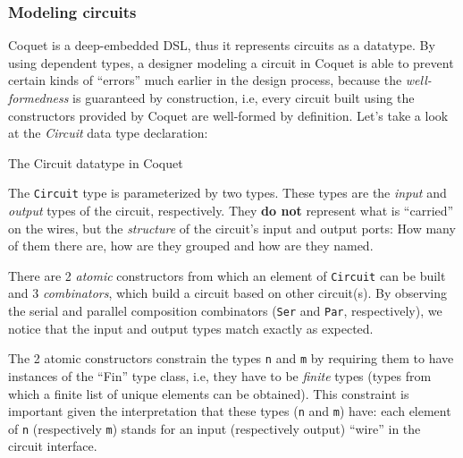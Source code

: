         \subsubsection{Modeling circuits}
        \label{subsubsec:coquet-modelling}
            Coquet is a deep-embedded DSL, thus it represents circuits as a datatype. By using
            dependent types, a designer modeling a circuit in Coquet is able to prevent certain
            kinds of ``errors'' much earlier in the design process, because the
            \emph{well-formedness} is guaranteed by construction, i.e, every circuit built using the
            constructors provided by Coquet are well-formed by definition. Let's take a look at the
            \emph{Circuit} data type declaration:

            \begin{listing}[h!]
                \caption{The Circuit datatype in Coquet
                    \label{lst:coquet-circuit-type}}
            \end{listing}

            The \texttt{Circuit} type is parameterized by two types. These types are the
            \emph{input} and \emph{output} types of the circuit, respectively. They \textbf{do not}
            represent what is ``carried'' on the wires, but the \emph{structure} of the circuit's
            input and output ports: How many of them there are, how are they grouped and how are
            they named.

            There are 2 \emph{atomic} constructors from which an element of \texttt{Circuit} can
            be built and 3 \emph{combinators}, which build a circuit based on other circuit(s).
            By observing the serial and parallel composition combinators (\texttt{Ser} and
            \texttt{Par}, respectively), we notice that the input and output types match exactly
            as expected.

            The 2 atomic constructors constrain the types \texttt{n} and \texttt{m} by requiring
            them to have instances of the ``Fin'' type class, i.e, they have to be \emph{finite}
            types (types from which a finite list of unique elements can be obtained). This
            constraint is important given the interpretation that these types (\texttt{n} and
            \texttt{m}) have: each element of \texttt{n} (respectively \texttt{m}) stands for an
            input (respectively output) ``wire'' in the circuit interface.

